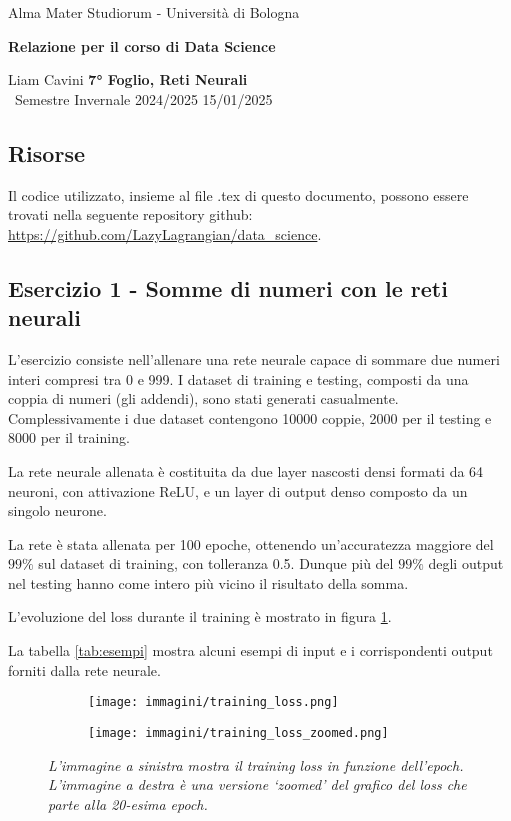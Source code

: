 \documentclass{article}
\begin{document}
\begin{center}
    {\Large Alma Mater Studiorum - Università di Bologna}
    
    \vspace{0.5cm}
    {\bf \large Relazione per il corso di Data Science}
\end{center} 

\noindent
{Liam Cavini} \hfill {\bf 7° Foglio, Reti Neurali}\\
{\ Semestre Invernale 2024/2025} \hfill 15/01/2025

\subsection*{Risorse}
Il codice utilizzato, insieme al file .tex di questo documento, possono essere trovati nella seguente repository github: \url{https://github.com/LazyLagrangian/data_science}.

\subsection*{Esercizio 1 - Somme di numeri con le reti neurali }
L'esercizio consiste nell'allenare una rete neurale capace di sommare due numeri interi compresi tra 0 e 999.
I dataset di training e testing, composti da una coppia di numeri (gli addendi), sono stati generati casualmente.
Complessivamente i due dataset contengono 10000 coppie, 2000 per il testing e 8000 per il training.

La rete neurale allenata è costituita da due layer nascosti densi formati da 64 neuroni, con attivazione ReLU, e un layer di output denso composto da un singolo neurone.

La rete è stata allenata per 100 epoche, ottenendo un'accuratezza maggiore del $ 99\%$ sul dataset di training, con tolleranza 0.5.
Dunque più del $99\%$ degli output nel testing hanno come intero più vicino il risultato della somma.

L'evoluzione del loss durante il training è mostrato in figura \ref{fig:loss_evolution}.

La tabella \ref{tab:esempi} mostra alcuni esempi di input e i corrispondenti output forniti dalla rete neurale.

\begin{figure}[H]
    \centering
    \begin{subfigure}[b]{0.49\textwidth}
        \centering
        \texttt{[image: immagini/training\_loss.png]}
    \end{subfigure}
    \begin{subfigure}[b]{0.49\textwidth}
        \centering
        \texttt{[image: immagini/training\_loss\_zoomed.png]}
    \end{subfigure}

    \caption{\emph{L'immagine a sinistra mostra il training loss in funzione dell'epoch. L'immagine a destra è una versione `zoomed' del grafico del loss che parte alla 20-esima epoch.}}
    \label{fig:loss_evolution}
\end{figure}
\end{document}
